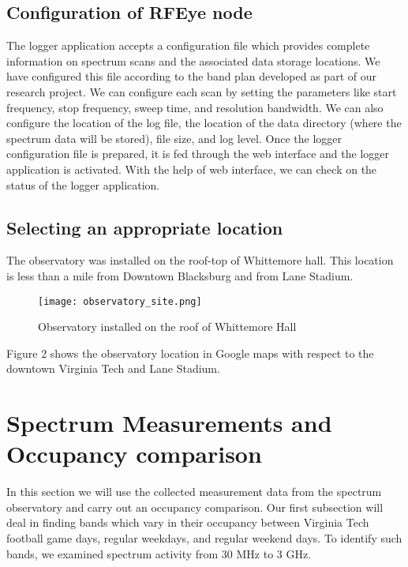 \documentclass[12pt,sts]{report}
\begin{document}
\subsection{Configuration of RFEye node}
	
	The logger application accepts a configuration file which provides complete information on spectrum scans and the associated data storage locations. We have configured this file according to the band plan developed as part of our research project. We can configure each scan by setting the parameters like start frequency, stop frequency, sweep time, and resolution bandwidth. We can also configure the location of the log file, the location of the data directory (where the spectrum data will be stored), file size, and log level. Once the logger configuration file is prepared, it is fed through the web interface and the logger application is activated. With the help of web interface, we can check on the status of the logger application.

\subsection{Selecting an appropriate location}
	
	The observatory was installed on the roof-top of Whittemore hall. This location is less than a mile from Downtown Blacksburg and from Lane Stadium.
	
	\begin{figure}[ht!]
  \centering
    \texttt{[image: observatory\_site.png]}
		\caption{Observatory installed on the roof of Whittemore Hall}
	\end{figure}

Figure 2 shows the observatory location in Google maps with respect to the downtown Virginia Tech and Lane Stadium.


\section{Spectrum Measurements and Occupancy comparison}

In this section we will use the collected measurement data from the spectrum observatory and carry out an occupancy comparison. Our first subsection will deal in finding bands which vary in their occupancy between Virginia Tech football game days, regular weekdays, and regular weekend days. To identify such bands, we examined spectrum activity from 30 MHz to 3 GHz.
\end{document}

